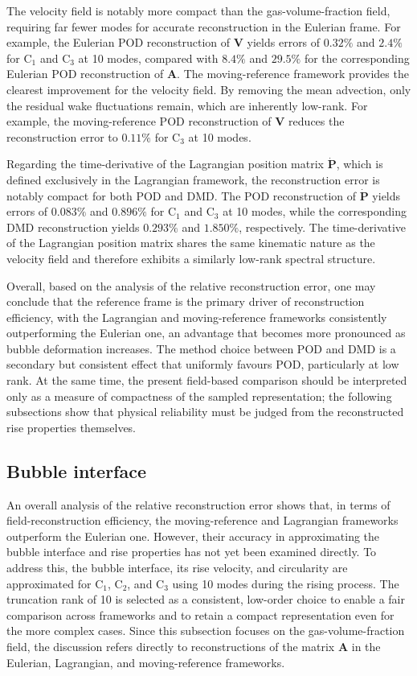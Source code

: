 \documentclass[a4paper,fleqn]{cas-sc}
\begin{document}
	The velocity field is notably more compact than the gas-volume-fraction field, requiring far fewer modes for accurate reconstruction in the Eulerian frame. For example, the Eulerian POD reconstruction of $\mathbf{V}$ yields errors of $0.32\%$ and $2.4\%$ for C$_1$ and C$_3$ at 10 modes, compared with $8.4\%$ and $29.5\%$ for the corresponding Eulerian POD reconstruction of $\mathbf{A}$. The moving-reference framework provides the clearest improvement for the velocity field. By removing the mean advection, only the residual wake fluctuations remain, which are inherently low-rank. For example, the moving-reference POD reconstruction of $\mathbf{V}$ reduces the reconstruction error to $0.11\%$ for C$_3$ at 10 modes.
	
	Regarding the time-derivative of the Lagrangian position matrix $\dot{\mathbf{P}}$, which is defined exclusively in the Lagrangian framework, the reconstruction error is notably compact for both POD and DMD. The POD reconstruction of $\dot{\mathbf{P}}$ yields errors of $0.083\%$ and $0.896\%$ for C$_1$ and C$_3$ at 10 modes, while the corresponding DMD reconstruction yields $0.293\%$ and $1.850\%$, respectively. The time-derivative of the Lagrangian position matrix shares the same kinematic nature as the velocity field and therefore exhibits a similarly low-rank spectral structure. 
	
	Overall, based on the analysis of the relative reconstruction error, one may conclude that the reference frame is the primary driver of reconstruction efficiency, with the Lagrangian and moving-reference frameworks consistently outperforming the Eulerian one, an advantage that becomes more pronounced as bubble deformation increases. The method choice between POD and DMD is a secondary but consistent effect that uniformly favours POD, particularly at low rank. At the same time, the present field-based comparison should be interpreted only as a measure of compactness of the sampled representation; the following subsections show that physical reliability must be judged from the reconstructed rise properties themselves.
	
	\subsection{Bubble interface}
	\label{Bubble interface}
	An overall analysis of the relative reconstruction error shows that, in terms of field-reconstruction efficiency, the moving-reference and Lagrangian frameworks outperform the Eulerian one. However, their accuracy in approximating the bubble interface and rise properties has not yet been examined directly. To address this, the bubble interface, its rise velocity, and circularity are approximated for C$_1$, C$_2$, and C$_3$ using 10 modes during the rising process. The truncation rank of 10 is selected as a consistent, low-order choice to enable a fair comparison across frameworks and to retain a compact representation even for the more complex cases. Since this subsection focuses on the gas-volume-fraction field, the discussion refers directly to reconstructions of the matrix $\mathbf{A}$ in the Eulerian, Lagrangian, and moving-reference frameworks.
	
\end{document}
